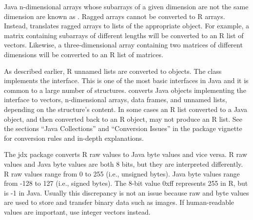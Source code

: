 Java n-dimensional arrays whose subarrays of a given dimension are not the same dimension are known as . Ragged arrays cannot be converted to R arrays. Instead,  translates ragged arrays to lists of the appropriate object. For example, a matrix containing subarrays of different lengths will be converted to an R list of vectors. Likewise, a three-dimensional array containing two matrices of different dimensions will be converted to an R list of matrices.

As described earlier, R unnamed lists are converted to \href{https://docs.oracle.com/javase/8/docs/api/java/util/ArrayList.html}{} objects. The  class implements the \href{https://docs.oracle.com/javase/8/docs/api/java/util/Collection.html}{} interface. This is one of the most basic interfaces in Java and it is common to a large number of structures.  converts Java objects implementing the  interface to vectors, n-dimensional arrays, data frames, and unnamed lists, depending on the structure's content. In some cases an R list converted to a Java object, and then converted back to an R object, may not produce an R list. See the sections ``Java Collections'' and ``Conversion Issues'' in the  package vignette for conversion rules and in-depth explanations.

The jdx package converts R raw values to Java byte values and vice versa. R raw values and Java byte values are both 8 bits, but they are interpreted differently. R raw values range from 0 to 255 (i.e., unsigned bytes). Java byte values range from -128 to 127 (i.e., signed bytes). The 8-bit value 0xff represents 255 in R, but is -1 in Java. Usually this discrepancy is not an issue because raw and byte values are used to store and transfer binary data such as images. If human-readable values are important, use integer vectors instead.

